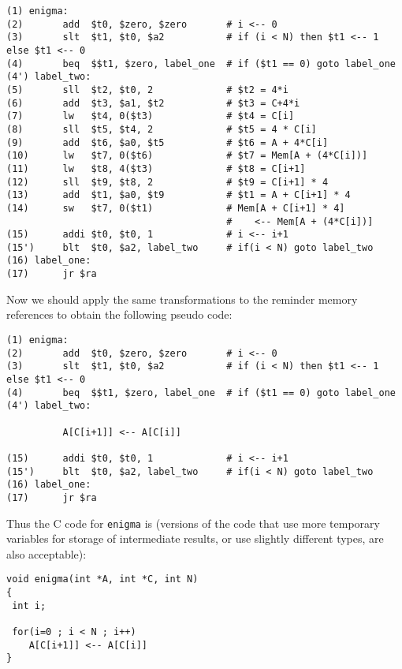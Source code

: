 \documentclass[psfig,11pt]{article}
\begin{document}
\begin{question}[25]
\begin{enumerate}
\begin{verbatim}
(1) enigma:
(2)       add  $t0, $zero, $zero       # i <-- 0
(3)       slt  $t1, $t0, $a2           # if (i < N) then $t1 <-- 1 else $t1 <-- 0
(4)       beq  $$t1, $zero, label_one  # if ($t1 == 0) goto label_one
(4') label_two:
(5)       sll  $t2, $t0, 2             # $t2 = 4*i
(6)       add  $t3, $a1, $t2           # $t3 = C+4*i
(7)       lw   $t4, 0($t3)             # $t4 = C[i]
(8)       sll  $t5, $t4, 2             # $t5 = 4 * C[i]
(9)       add  $t6, $a0, $t5           # $t6 = A + 4*C[i]
(10)      lw   $t7, 0($t6)             # $t7 = Mem[A + (4*C[i])]
(11)      lw   $t8, 4($t3)             # $t8 = C[i+1]
(12)      sll  $t9, $t8, 2             # $t9 = C[i+1] * 4
(13)      add  $t1, $a0, $t9           # $t1 = A + C[i+1] * 4
(14)      sw   $t7, 0($t1)             # Mem[A + C[i+1] * 4] 
                                       #    <-- Mem[A + (4*C[i])]
(15)      addi $t0, $t0, 1             # i <-- i+1
(15')     blt  $t0, $a2, label_two     # if(i < N) goto label_two
(16) label_one:
(17)      jr $ra
\end{verbatim}

Now we should apply the same transformations to the reminder
  memory references to obtain the following pseudo code:

\begin{verbatim}
(1) enigma:
(2)       add  $t0, $zero, $zero       # i <-- 0
(3)       slt  $t1, $t0, $a2           # if (i < N) then $t1 <-- 1 else $t1 <-- 0
(4)       beq  $$t1, $zero, label_one  # if ($t1 == 0) goto label_one
(4') label_two:

          A[C[i+1]] <-- A[C[i]]

(15)      addi $t0, $t0, 1             # i <-- i+1
(15')     blt  $t0, $a2, label_two     # if(i < N) goto label_two
(16) label_one:
(17)      jr $ra
\end{verbatim}

Thus the C code for {\tt enigma} is
  (versions of the code that use more temporary variables for storage
  of intermediate results, or use slightly different types, are also
  acceptable):

\begin{verbatim}
void enigma(int *A, int *C, int N)
{
 int i;

 for(i=0 ; i < N ; i++)
    A[C[i+1]] <-- A[C[i]]
}    
\end{verbatim}
\color{black}

\fi

\end{enumerate}

\end{question}
\end{document}

